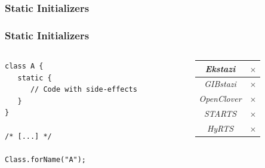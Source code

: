 \documentclass[notes,aspectratio=169]{beamer}
\makeatletter
\newcommand{\warn}{\raisebox{0.325ex}{\resizebox{!}{1.2ex}{\warning}}}
\newcommand{\fail}[1]{\textcolor{red!50!black}{\emph{#1}} & \textcolor{red!50!black}{$\times$ }\\}
\newcommand{\timer}[1]{\note{S:\@#1:00\\}}
\makeatother
\begin{document}
\subsubsection{Static Initializers}
\begin{subframe}[fragile]
   \frametitle{Static Initializers}
   \begin{columns}

      \begin{column}{0.5\textwidth}
         \begin{lstlisting}[frame=tlrb]
class A {
   static {
      // Code with side-effects
   }
}

/* [...] */

Class.forName("A");
\end{lstlisting}
      \end{column}

      \begin{column}{0.3\textwidth}
         \begin{tabular}{|c|c|}
            \hline
            \fail{Ekstazi}
            \hline
            \fail{GIBstazi}
            \hline
            \fail{OpenClover}
            \hline
            \fail{STARTS}
            \hline
            \fail{HyRTS}
            \hline
         \end{tabular}
      \end{column}
   \end{columns}
   \timer{10}
\end{subframe}
\end{document}
